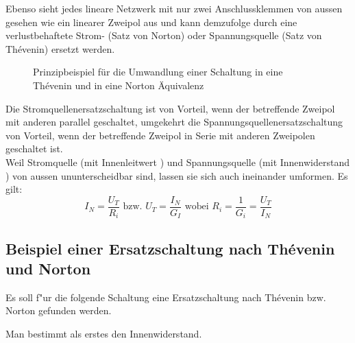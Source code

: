 \documentclass[german, 10pt, a4paper, headsepline]{scrreprt}
\theoremstyle{remark}
\begin{document}
Ebenso sieht jedes lineare Netzwerk mit nur zwei Anschlussklemmen von aussen gesehen wie ein linearer Zweipol aus und kann demzufolge durch eine verlustbehaftete Strom- (Satz von Norton) oder Spannungsquelle  (Satz von Th\'evenin) ersetzt werden.

\begin{figure}[hbt]
 
 \centerline{\box\graph}
 \caption{Prinzipbeispiel f\"ur die Umwandlung einer Schaltung in eine Th\'evenin und in eine Norton \"Aquivalenz}
 \label{thevenin_norton_fig}
\end{figure}

Die Stromquellenersatzschaltung ist von Vorteil, wenn der betreffende Zweipol mit anderen parallel geschaltet, umgekehrt die Spannungsquellenersatzschaltung von Vorteil, wenn der betreffende Zweipol in Serie mit anderen Zweipolen geschaltet ist.\\

Weil Stromquelle (mit Innenleitwert ) und Spannungsquelle (mit Innenwiderstand ) von aussen ununterscheidbar sind, lassen sie sich auch ineinander umformen. Es gilt:\\

\begin{displaymath}
	I_N=\frac{U_T}{R_i} \mbox{ bzw. } U_T=\frac{I_N}{G_I} \mbox{ wobei } R_i=\frac{1}{G_i}=\frac{U_T}{I_N}
\end{displaymath}

\subsection{Beispiel einer Ersatzschaltung nach Th\'evenin und Norton}

Es soll f"ur die folgende Schaltung eine Ersatzschaltung nach Th\'evenin bzw. Norton gefunden werden.

\begin{figure}[hbt]
 
 \centerline{\box\graph}
\end{figure}

Man bestimmt als erstes den Innenwiderstand.\\

\normalfont

\begin{figure}[hbt]
 
 \centerline{\box\graph}
\end{figure}
\end{document}
